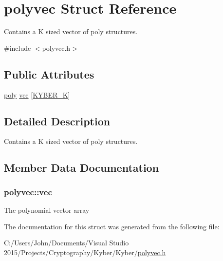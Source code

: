 \hypertarget{structpolyvec}{}\section{polyvec Struct Reference}
\label{structpolyvec}


Contains a K sized vector of poly structures.  




{\ttfamily \#include $<$polyvec.\+h$>$}

\subsection*{Public Attributes}
\begin{DoxyCompactItemize}
\item 
\hyperlink{structpoly}{poly} \hyperlink{structpolyvec_ac40ed8707ee3f565dc97c2e568510084}{vec} \mbox{[}\hyperlink{params_8h_a1e66e19d25aceeae49d1184a077f92db}{K\+Y\+B\+E\+R\+\_\+\+K}\mbox{]}
\end{DoxyCompactItemize}


\subsection{Detailed Description}
Contains a K sized vector of poly structures. 

\subsection{Member Data Documentation}
\hypertarget{structpolyvec_ac40ed8707ee3f565dc97c2e568510084}{}
\subsubsection[{vec}]{\setlength{\rightskip}{0pt plus 5cm}polyvec\+::vec}\label{structpolyvec_ac40ed8707ee3f565dc97c2e568510084}
The polynomial vector array 

The documentation for this struct was generated from the following file\+:\begin{DoxyCompactItemize}
\item 
C\+:/\+Users/\+John/\+Documents/\+Visual Studio 2015/\+Projects/\+Cryptography/\+Kyber/\+Kyber/\hyperlink{polyvec_8h}{polyvec.\+h}\end{DoxyCompactItemize}
